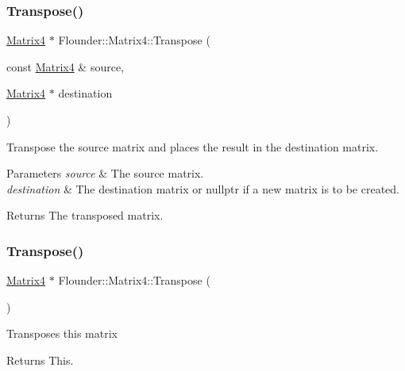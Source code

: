 \subsubsection{\texorpdfstring{Transpose()}{Transpose()}\hspace{0.1cm}{\footnotesize\ttfamily [1/2]}}
{\footnotesize\ttfamily \hyperlink{class_flounder_1_1_matrix4}{Matrix4} $\ast$ Flounder\+::\+Matrix4\+::\+Transpose (\begin{DoxyParamCaption}\item[{const \hyperlink{class_flounder_1_1_matrix4}{Matrix4} \&}]{source,  }\item[{\hyperlink{class_flounder_1_1_matrix4}{Matrix4} $\ast$}]{destination }\end{DoxyParamCaption})\hspace{0.3cm}{\ttfamily [static]}}



Transpose the source matrix and places the result in the destination matrix. 


\begin{DoxyParams}{Parameters}
{\em source} & The source matrix. \\
\hline
{\em destination} & The destination matrix or nullptr if a new matrix is to be created. \\
\hline
\end{DoxyParams}
\begin{DoxyReturn}{Returns}
The transposed matrix. 
\end{DoxyReturn}
\mbox{\label{class_flounder_1_1_matrix4_aefe1d209cfb6015f227524ee11a862a2}} 
\subsubsection{\texorpdfstring{Transpose()}{Transpose()}\hspace{0.1cm}{\footnotesize\ttfamily [2/2]}}
{\footnotesize\ttfamily \hyperlink{class_flounder_1_1_matrix4}{Matrix4} $\ast$ Flounder\+::\+Matrix4\+::\+Transpose (\begin{DoxyParamCaption}{ }\end{DoxyParamCaption})}



Transposes this matrix 

\begin{DoxyReturn}{Returns}
This. 
\end{DoxyReturn}
\mbox{\label{class_flounder_1_1_matrix4_a511e0cbc3959644d149dec2c2fe14ece}} 
